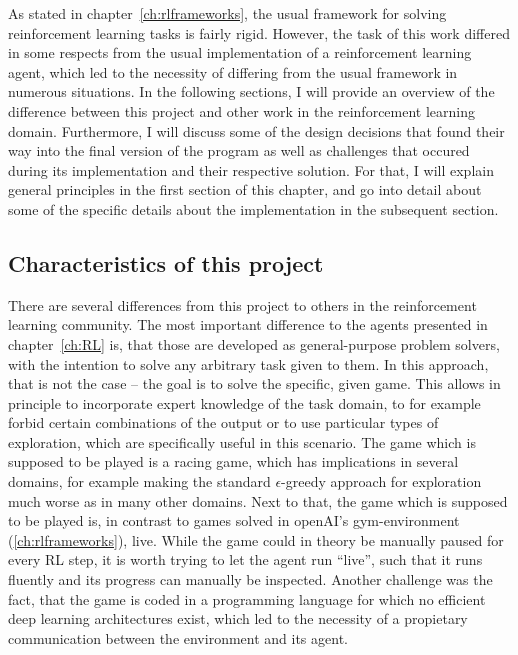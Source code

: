 As stated in chapter~\ref{ch:rlframeworks}, the usual framework for solving reinforcement learning tasks is fairly rigid. However, the task of this work differed in some respects from the usual implementation of a reinforcement learning agent, which led to the necessity of differing from the usual framework in numerous situations. In the following sections, I will provide an overview of the difference between this project and other work in the reinforcement learning domain. Furthermore, I will discuss some of the design decisions that found their way into the final version of the program as well as challenges that occured during its implementation and their respective solution. For that, I will explain general principles in the first section of this chapter, and go into detail about some of the specific details about the implementation in the subsequent section.

\subsection{Characteristics of this project} \label{ch:projectcharacteristics}

There are several differences from this project to others in the reinforcement learning community. The most important difference to the agents presented in chapter~\ref{ch:RL} is, that those are developed as general-purpose problem solvers, with the intention to solve any arbitrary task given to them. In this approach, that is not the case -- the goal is to solve the specific, given game. This allows in principle to incorporate expert knowledge of the task domain, to for example forbid certain combinations of the output or to use particular types of exploration, which are specifically useful in this scenario. The game which is supposed to be played is a racing game, which has implications in several domains, for example making the standard $\epsilon$-greedy approach for exploration much worse as in many other domains. Next to that, the game which is supposed to be played is, in contrast to games solved in openAI's gym-environment (\ref{ch:rlframeworks}), live. While the game could in theory be manually paused for every RL step, it is worth trying to let the agent run ``live'', such that it runs fluently and its progress can manually be inspected. Another challenge was the fact, that the game is coded in a programming language for which no efficient deep learning architectures exist, which led to the necessity of a propietary communication between the environment and its agent.

